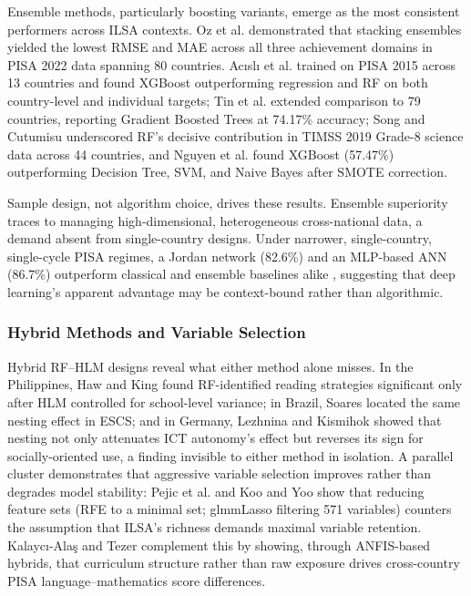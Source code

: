 \documentclass{ieeeaccess}
\begin{document}
Ensemble methods, particularly boosting variants, emerge as the most consistent performers across ILSA contexts. Oz et al. \cite{oz-etal2024} demonstrated that stacking ensembles yielded the lowest RMSE and MAE across all three achievement domains in PISA 2022 data spanning 80 countries. Ac{\i}sl{\i} et al. \cite{acisli-celik-yesilkanat2023} trained on PISA 2015 across 13 countries and found XGBoost outperforming regression and RF on both country-level and individual targets; Tin et al. \cite{tin-etal2024} extended comparison to 79 countries, reporting Gradient Boosted Trees at 74.17\% accuracy; Song and Cutumisu \cite{song-cutumisu2024} underscored RF's decisive contribution in TIMSS 2019 Grade-8 science data across 44 countries, and Nguyen et al. \cite{nguyen-etal2023} found XGBoost (57.47\%) outperforming Decision Tree, SVM, and Naive Bayes after SMOTE correction.

Sample design, not algorithm choice, drives these results. Ensemble superiority traces to managing high-dimensional, heterogeneous cross-national data, a demand absent from single-country designs. Under narrower, single-country, single-cycle PISA regimes, a Jordan network (82.6\%) and an MLP-based ANN (86.7\%) outperform classical and ensemble baselines alike \cite{demir-karaboga2021, bezek-gure-etal2020}, suggesting that deep learning's apparent advantage may be context-bound rather than algorithmic.

\subsubsection{Hybrid Methods and Variable Selection}\label{subsubsec4.1.2}

Hybrid RF--HLM designs reveal what either method alone misses. In the Philippines, Haw and King \cite{haw-king2023} found RF-identified reading strategies significant only after HLM controlled for school-level variance; in Brazil, Soares \cite{soares2024} located the same nesting effect in ESCS; and in Germany, Lezhnina and Kismihok \cite{lezhnina-kismihok2022} showed that nesting not only attenuates ICT autonomy's effect but reverses its sign for socially-oriented use, a finding invisible to either method in isolation. A parallel cluster demonstrates that aggressive variable selection improves rather than degrades model stability: Pejic et al. \cite{pejic-etal2021} and Koo and Yoo \cite{koo-yoo2025} show that reducing feature sets (RFE to a minimal set; glmmLasso filtering 571 variables) counters the assumption that ILSA's richness demands maximal variable retention. Kalaycı-Alaş and Tezer \cite{kalayci-alas-tezer2024} complement this by showing, through ANFIS-based hybrids, that curriculum structure rather than raw exposure drives cross-country PISA language--mathematics score differences.
\end{document}
